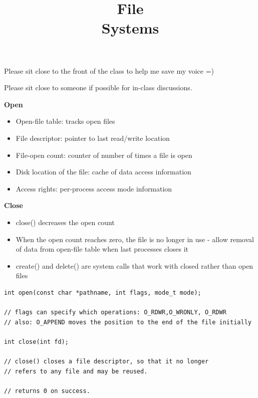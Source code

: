 

\title{File\\Systems}



\begin{slide}
	Please sit close to the front of the class to help me save my voice =)
	\bigskip
	
	Please sit close to someone if possible for in-class discussions.
\end{slide}

\begin{frame}
    \titlepage
\end{frame}

\begin{slide}

    \textbf{Open}
    \begin{itemize}
        \item Open-file table: tracks open files
        \item File descriptor: pointer to last read/write location
        \item File-open count: counter of number of times a file is open
        \item Disk location of the file: cache of data access information
        \item Access rights: per-process access mode information
    \end{itemize}
    \medskip

    \textbf{Close}
    \begin{itemize}
        \item close() decreases the open count
        \item When the open count reaches zero, the file is no longer in use - allow removal of data from open-file table when last processes closes it
        \item create() and delete() are system calls that work with closed rather than open files
    \end{itemize}

\end{slide}

\begin{slide}


    \begin{verbatim}
int open(const char *pathname, int flags, mode_t mode);

// flags can specify which operations: O_RDWR,O_WRONLY, O_RDWR
// also: O_APPEND moves the position to the end of the file initially

int close(int fd);

// close() closes a file descriptor, so that it no longer 
// refers to any file and may be reused.

// returns 0 on success.
  \end{verbatim}
  
\end{slide}


